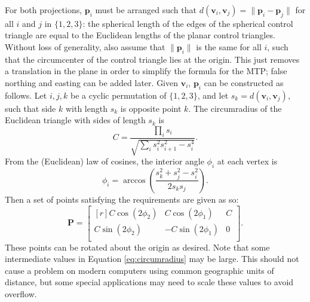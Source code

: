 \documentclass[]{interact}
\begin{document}
For both projections, $\mathbf p_i$ must be arranged such that
$d\left(\mathbf v_i, \mathbf v_j\right) = \|\mathbf p_i - \mathbf p_j\|$
for all $i$ and $j$ in $\{1, 2, 3\}$: the spherical length of the edges of the
spherical control triangle are equal to the Euclidean lengths of the planar
control triangles. Without loss of generality, also assume that
$\|\mathbf p_i\|$ is the same for all $i$, such that the circumcenter of the
control triangle lies at the origin. This just removes a translation in the
plane in order to simplify the formula for the MTP; false northing and easting
can be added later. Given $\mathbf v_i$, $\mathbf p_i$ can be constructed as
follows. Let $i, j, k$ be a cyclic permutation of $\{1, 2, 3\}$,
and let $s_k = d\left(\mathbf v_i, \mathbf v_j\right)$,
such that side $k$ with length $s_k$ is opposite point $k$. The circumradius
of the Euclidean triangle with sides of length $s_k$ is \citep{isaacs}
\begin{equation}\label{eq:circumradius}
  C = \frac{\prod_i s_i}{\sqrt{\sum_i s_i^2 s_{i+1}^2 - s_i^4}}.
\end{equation}
From the (Euclidean) law of cosines,
the interior angle $\phi_i$ at each vertex is
\begin{equation}\label{eq:phi}
  \phi_i = \arccos \left( \frac{s_k^2 + s_j^2 - s_i^2}{2 s_k s_j}\right).
\end{equation}
Then a set of points satisfying the requirements are given as so:
\begin{equation}\label{eq:planarctrlpts}
  \mathbf P = \begin{bmatrix*}[r]
  C \cos \left(2 \phi_2 \right) &
  C \cos \left(2 \phi_1 \right) &
  C \\
  C \sin \left(2 \phi_2 \right) &
  -C \sin \left(2 \phi_1 \right) &
  0 \\
\end{bmatrix*}.
\end{equation}
These points can be rotated about the origin as desired. Note that some
intermediate values in Equation \ref{eq:circumradius} may be large. This
should not cause a problem on modern computers using common geographic
units of distance, but some special applications may need to scale these
values to avoid overflow.
\end{document}
